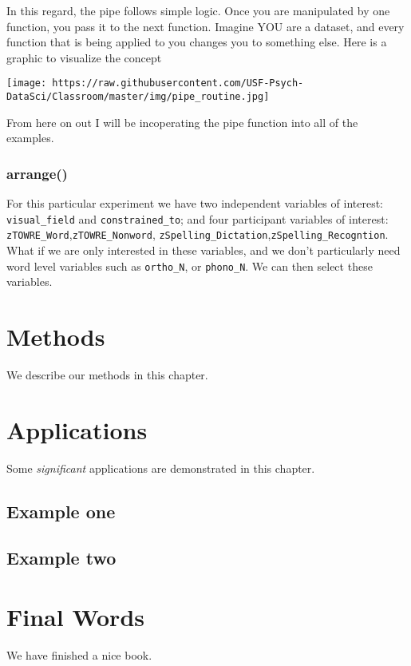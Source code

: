 \documentclass[
]{book}
\begin{document}
In this regard, the pipe follows simple logic. Once you are manipulated by one function, you pass it to the next function. Imagine YOU are a dataset, and every function that is being applied to you changes you to something else. Here is a graphic to visualize the concept

\texttt{[image: https://raw.githubusercontent.com/USF-Psych-DataSci/Classroom/master/img/pipe\_routine.jpg]}

From here on out I will be incoperating the pipe function into all of the examples.

\hypertarget{arrange}{%
\subsection{arrange()}\label{arrange}}

For this particular experiment we have two independent variables of interest: \texttt{visual\_field} and \texttt{constrained\_to}; and four participant variables of interest: \texttt{zTOWRE\_Word},\texttt{zTOWRE\_Nonword}, \texttt{zSpelling\_Dictation},\texttt{zSpelling\_Recogntion}. What if we are only interested in these variables, and we don't particularly need word level variables such as \texttt{ortho\_N}, or \texttt{phono\_N}. We can then select these variables.

\hypertarget{methods}{%
\chapter{Methods}\label{methods}}

We describe our methods in this chapter.

\hypertarget{applications}{%
\chapter{Applications}\label{applications}}

Some \emph{significant} applications are demonstrated in this chapter.

\hypertarget{example-one}{%
\section{Example one}\label{example-one}}

\hypertarget{example-two}{%
\section{Example two}\label{example-two}}

\hypertarget{final-words}{%
\chapter{Final Words}\label{final-words}}

We have finished a nice book.

  
\end{document}
